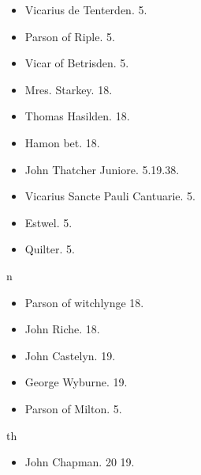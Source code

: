 \documentclass[12pt, a4paper]{book}
\begin{document}
				\begin{itemize}
					\item[]Vicarius de Tenterden. 5.
					\item[]Parson of Riple. 5.
					\item[]Vicar of Betrisden. 5.
				\end{itemize}
            			\begin{itemize}
            				\item[]Mres. Starkey. 18.
            				\item[]Thomas Hasilden. 18.
            				\item[]Hamon bet. 18.
            			\end{itemize}
            		
            		
            			
				\marginpar[\vspace{0.5cm}{\textcolor{Gray}{n}}]{}
			
            			
				\marginpar[\vspace{0.5cm}{\textcolor{Gray}{n}}]{}
			
            			
				\marginpar[\vspace{0.5cm}{\textcolor{Gray}{th n}}]{}
			
            			
				\marginpar[\vspace{0.5cm}{\textcolor{Gray}{n}}]{}
			
            			\begin{itemize}
					\item[]John Thatcher Juniore. 5.19.38.
					\item[]Vicarius Sancte Pauli Cantuarie. 5.
					\item[]Estwel. 5.
					\item[]Quilter. 5.
					
				\end{itemize}
            			n
            			\begin{itemize}
            				\item[]Parson of witchlynge 18.
            				\item[]John Riche. 18.
            				\item[]John Castelyn. 19.
            				\item[]George Wyburne. 19.
            			\end{itemize}
			
            		
            			\begin{itemize}
            				\item[]Parson of Milton. 5.
            			\end{itemize}
            			th
            			\begin{itemize}
            				\item[]John Chapman. 20 19.
            			\end{itemize}
            		
\end{document}
